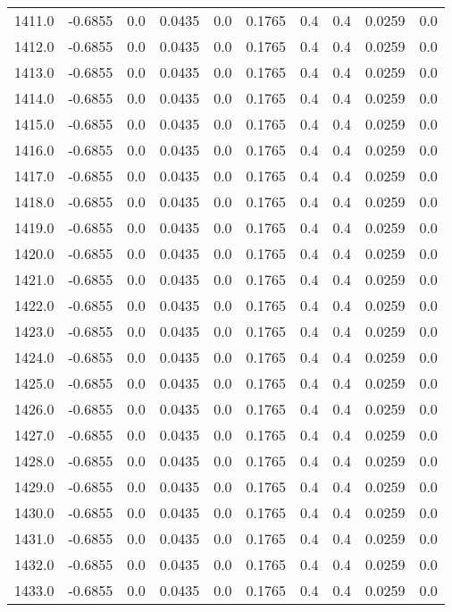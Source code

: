 \begin{longtable}{lrrrrrrrrr}
1411.0 & -0.6855 & 0.0 & 0.0435 & 0.0 & 0.1765 & 0.4 & 0.4 & 0.0259 & 0.0 \\
1412.0 & -0.6855 & 0.0 & 0.0435 & 0.0 & 0.1765 & 0.4 & 0.4 & 0.0259 & 0.0 \\
1413.0 & -0.6855 & 0.0 & 0.0435 & 0.0 & 0.1765 & 0.4 & 0.4 & 0.0259 & 0.0 \\
1414.0 & -0.6855 & 0.0 & 0.0435 & 0.0 & 0.1765 & 0.4 & 0.4 & 0.0259 & 0.0 \\
1415.0 & -0.6855 & 0.0 & 0.0435 & 0.0 & 0.1765 & 0.4 & 0.4 & 0.0259 & 0.0 \\
1416.0 & -0.6855 & 0.0 & 0.0435 & 0.0 & 0.1765 & 0.4 & 0.4 & 0.0259 & 0.0 \\
1417.0 & -0.6855 & 0.0 & 0.0435 & 0.0 & 0.1765 & 0.4 & 0.4 & 0.0259 & 0.0 \\
1418.0 & -0.6855 & 0.0 & 0.0435 & 0.0 & 0.1765 & 0.4 & 0.4 & 0.0259 & 0.0 \\
1419.0 & -0.6855 & 0.0 & 0.0435 & 0.0 & 0.1765 & 0.4 & 0.4 & 0.0259 & 0.0 \\
1420.0 & -0.6855 & 0.0 & 0.0435 & 0.0 & 0.1765 & 0.4 & 0.4 & 0.0259 & 0.0 \\
1421.0 & -0.6855 & 0.0 & 0.0435 & 0.0 & 0.1765 & 0.4 & 0.4 & 0.0259 & 0.0 \\
1422.0 & -0.6855 & 0.0 & 0.0435 & 0.0 & 0.1765 & 0.4 & 0.4 & 0.0259 & 0.0 \\
1423.0 & -0.6855 & 0.0 & 0.0435 & 0.0 & 0.1765 & 0.4 & 0.4 & 0.0259 & 0.0 \\
1424.0 & -0.6855 & 0.0 & 0.0435 & 0.0 & 0.1765 & 0.4 & 0.4 & 0.0259 & 0.0 \\
1425.0 & -0.6855 & 0.0 & 0.0435 & 0.0 & 0.1765 & 0.4 & 0.4 & 0.0259 & 0.0 \\
1426.0 & -0.6855 & 0.0 & 0.0435 & 0.0 & 0.1765 & 0.4 & 0.4 & 0.0259 & 0.0 \\
1427.0 & -0.6855 & 0.0 & 0.0435 & 0.0 & 0.1765 & 0.4 & 0.4 & 0.0259 & 0.0 \\
1428.0 & -0.6855 & 0.0 & 0.0435 & 0.0 & 0.1765 & 0.4 & 0.4 & 0.0259 & 0.0 \\
1429.0 & -0.6855 & 0.0 & 0.0435 & 0.0 & 0.1765 & 0.4 & 0.4 & 0.0259 & 0.0 \\
1430.0 & -0.6855 & 0.0 & 0.0435 & 0.0 & 0.1765 & 0.4 & 0.4 & 0.0259 & 0.0 \\
1431.0 & -0.6855 & 0.0 & 0.0435 & 0.0 & 0.1765 & 0.4 & 0.4 & 0.0259 & 0.0 \\
1432.0 & -0.6855 & 0.0 & 0.0435 & 0.0 & 0.1765 & 0.4 & 0.4 & 0.0259 & 0.0 \\
1433.0 & -0.6855 & 0.0 & 0.0435 & 0.0 & 0.1765 & 0.4 & 0.4 & 0.0259 & 0.0 \\

\end{longtable}
